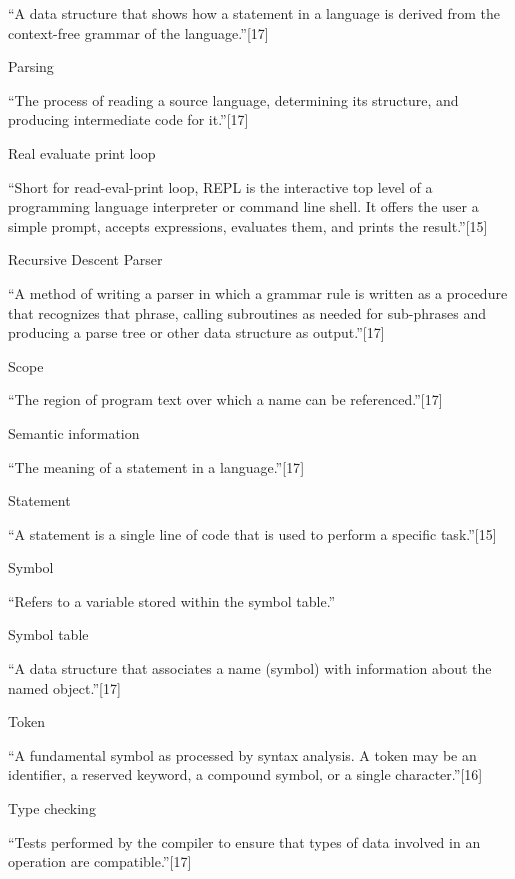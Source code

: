 \documentclass[
]{report}
\begin{document}
``A data structure that shows how a statement in a language is derived
from the context-free grammar of the language.''{[}17{]}

Parsing

``The process of reading a source language, determining its structure,
and producing intermediate code for it.''{[}17{]}

Real evaluate print loop

``Short for read-eval-print loop, REPL is the interactive top level of a
programming language interpreter or command line shell. It offers the
user a simple prompt, accepts expressions, evaluates them, and prints
the result.''{[}15{]}

Recursive Descent Parser

``A method of writing a parser in which a grammar rule is written as a
procedure that recognizes that phrase, calling subroutines as needed for
sub-phrases and producing a parse tree or other data structure as
output.''{[}17{]}

Scope

``The region of program text over which a name can be
referenced.''{[}17{]}

Semantic information

``The meaning of a statement in a language.''{[}17{]}

Statement

``A statement is a single line of code that is used to perform a
specific task.''{[}15{]}

Symbol

``Refers to a variable stored within the symbol table.''

Symbol table

``A data structure that associates a name (symbol) with information
about the named object.''{[}17{]}

Token

``A fundamental symbol as processed by syntax analysis. A token may be
an identifier, a reserved keyword, a compound symbol, or a single
character.''{[}16{]}

Type checking

``Tests performed by the compiler to ensure that types of data involved
in an operation are compatible.''{[}17{]}
\end{document}

